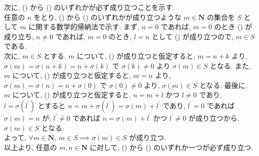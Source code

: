\begin{nmprob}
{次に, () から () のいずれかが必ず成り立つことを示す.\\
任意の $n$ をとり, () から () のいずれかが成り立つような $m \in \bm{N}$ の集合を $S$ として $m$ に関する数学的帰納法で示す.
まず, $n = 0$ であれば, $m = 0$ のとき () が成り立ち, $n \neq 0$ であれば, $m = 0$ のとき, $l = n$ として () が成り立つので, $m \in S$ である.\\
次に, $m \in S$ とする. $m$ について, () が成り立つと仮定すると, $m = n + k$ より, $\sigma (m) = \sigma (n + k) = n + \sigma (k)$ で $\sigma (k) \neq 0$ より $\sigma (m) \in S$ となる.
また, $m$ について, () が成り立つと仮定すると, $m = n$ より, $\sigma (m) = \sigma (n) = n + \sigma (0)$ で $\sigma (0) \neq 0$ より, $\sigma (m) \in S$ となる.
最後に, $m$ について, () が成り立つと仮定すると, $n = m + l$ かつ $l \neq 0$ であり, $l = \sigma (l^{'})$ とすると $n = m + \sigma (l^{'}) = \sigma (m) + l^{'}$ であり,
$l^{'} = 0$ であれば $\sigma (m) = n$ が, $l^{'} \neq 0$ であれば $n = \sigma (m) + l^{'}$ かつ $l^{'} \neq 0$ が成り立つから, $\sigma (m) \in S$ となる.\\
よって, $\forall m \in \bm{N},\ m \in S \implies \sigma (m) \in S$ が成り立つ.\\
以上より, 任意の $m, n \in \bm{N}$ に対して, () から () のいずれか一つが必ず成り立つ.
} 
\end{nmprob}



